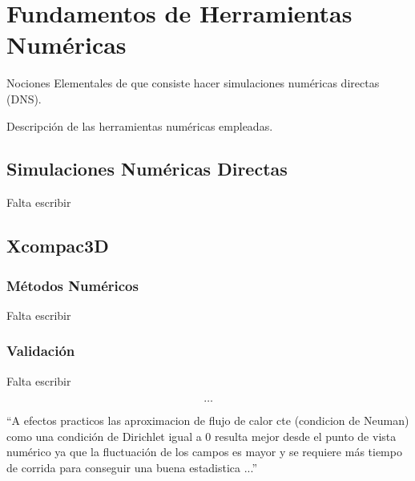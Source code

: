 \chapter{Fundamentos de Herramientas Numéricas} \label{cap:numerico}


Nociones Elementales de que consiste hacer simulaciones numéricas directas (DNS).

Descripción de las herramientas numéricas empleadas.


\newpage

\section{Simulaciones Numéricas Directas}

Falta escribir

\section{Xcompac3D}



\subsection{Métodos Numéricos}
Falta escribir

\subsection{Validación}
Falta escribir

$$\dots$$

``A efectos practicos las aproximacion de flujo de calor cte (condicion de Neuman) como una condición de Dirichlet igual a 0 resulta mejor desde el punto de vista numérico ya que la fluctuación de los campos es mayor y se requiere más tiempo de corrida para conseguir una buena estadistica ...''

